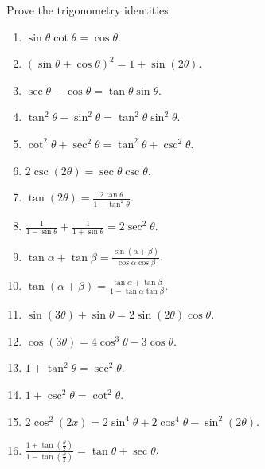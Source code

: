 Prove the trigonometry identities.
\begin{multicols}{2}
\begin{enumerate}[ref={\fcProblemRef}]
\item $\displaystyle \sin \theta\cot \theta =\cos \theta$.
\item $\displaystyle (\sin \theta +\cos \theta)^2=1+\sin(2\theta)$.
\item $\displaystyle \sec \theta - \cos \theta= \tan \theta \sin \theta$.
\item $\displaystyle \tan^2 \theta-\sin^2 \theta=\tan^2\theta\sin^2\theta$.
\item $\displaystyle \cot^2\theta+\sec^2\theta= \tan^2\theta+\csc^2\theta$.
\item $\displaystyle 2\csc (2\theta)= \sec \theta \csc \theta$.
\item $\displaystyle \tan (2\theta) =\frac{2\tan \theta}{1-\tan^2\theta} $.
\item $\displaystyle \frac{1}{1-\sin \theta}+ \frac{1}{1+\sin \theta}=2\sec^2\theta$.
\item $\displaystyle \tan \alpha + \tan \beta = \frac{\sin (\alpha+\beta)}{\cos \alpha \cos \beta}$.
\item $\displaystyle \tan (\alpha+\beta)= \frac{\tan \alpha +\tan \beta}{1-\tan \alpha\tan \beta}$.
\item $\displaystyle \sin (3\theta) +\sin \theta = 2 \sin (2\theta ) \cos \theta $.
\item $\displaystyle \cos (3\theta) = 4\cos^3\theta-3\cos \theta $.
\item $\displaystyle 1+\tan^2\theta = \sec^2\theta$.
\item $\displaystyle 1+\csc^2\theta = \cot^2\theta$.
\item $2\cos^2(2x)=2\sin^4 \theta +2\cos^4 \theta - \sin^2(2\theta)$.
\item $\displaystyle \frac{1+\tan \left(\frac{\theta}{2} \right) } {1 -\tan \left(\frac{\theta}{2}\right)}= \tan \theta +\sec \theta$.
\end{enumerate} 
\end{multicols}
